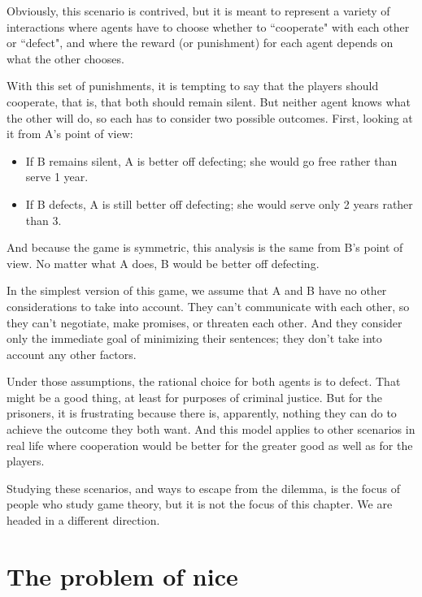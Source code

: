 \documentclass[12pt]{book}
\theoremstyle{exercise}
\begin{document}
Obviously, this scenario is contrived, but it is meant to represent a variety of interactions where agents have to choose whether to ``cooperate" with each other or ``defect", and where the reward (or punishment) for each agent depends on what the other chooses.

With this set of punishments, it is tempting to say that the players should cooperate, that is, that both should remain silent.  But neither agent knows what the other will do, so each has to consider two possible outcomes.  First, looking at it from A's point of view:

\begin{itemize}

\item If B remains silent, A is better off defecting; she would go free rather than serve 1 year. 

\item If B defects, A is still better off defecting; she would serve only 2 years rather than 3.

\end{itemize}

And because the game is symmetric, this analysis is the same from B's point of view.  No matter what A does, B would be better off defecting.

In the simplest version of this game, we assume that A and B have no other considerations to take into account.  They can't communicate with each other, so they can't negotiate, make promises, or threaten each other.  And they consider only the immediate goal of minimizing their sentences; they don't take into account any other factors.

Under those assumptions, the rational choice for both agents is to defect.  That might be a good thing, at least for purposes of criminal justice.  But for the prisoners, it is frustrating because there is, apparently, nothing they can do to achieve the outcome they both want.  And this model applies to other scenarios in real life where cooperation would be better for the greater good as well as for the players.

Studying these scenarios, and ways to escape from the dilemma, is the focus of people who study game theory, but it is not the focus of this chapter.  We are headed in a different direction.


\section{The problem of nice}
\end{document}
